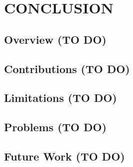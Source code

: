 \chapter{CONCLUSION}
\label{ch:conclusion}

\section{Overview (TO DO)}

\section{Contributions (TO DO)}

\section{Limitations (TO DO)}

\section{Problems (TO DO)}

\section{Future Work (TO DO)}